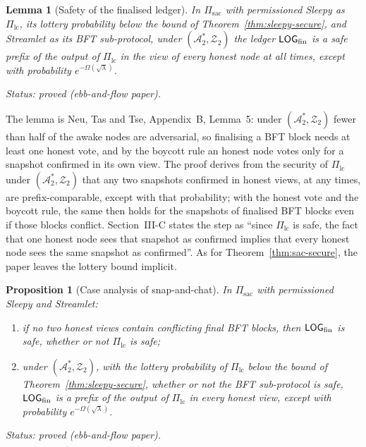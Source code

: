 \documentclass[11pt,a4paper]{article}
\newtheorem{lemma}[theorem]{Lemma}
\newtheorem{proposition}[theorem]{Proposition}
\theoremstyle{definition}
\newcommand{\Adv}{\mathcal{A}}
\newcommand{\Pilc}{\Pi_{\mathrm{lc}}}
\newcommand{\Pisac}{\Pi_{\mathrm{sac}}}
\newcommand{\Env}{\mathcal{Z}}
\begin{document}
\begin{lemma}[Safety of the finalised ledger]\label{lem:sac-fin-safe}
In $\Pisac$ with permissioned Sleepy as $\Pilc$, its lottery probability
below the bound of Theorem~\ref{thm:sleepy-secure}, and Streamlet as its BFT
sub-protocol, under $(\Adv_2^*, \Env_2)$ the ledger $\LOGfin$ is a safe
prefix of the output of $\Pilc$ in the view of every honest node at all
times, except with probability $e^{-\Omega(\sqrt{\lambda})}$.

Status: proved (ebb-and-flow paper).
\end{lemma}

The lemma is Neu, Tas and Tse, Appendix~B, Lemma~5: under
$(\Adv_2^*, \Env_2)$ fewer than half of the awake nodes are adversarial, so
finalising a BFT block needs at least one honest vote, and by the boycott
rule an honest node votes only for a snapshot confirmed in its own view. The
proof derives from the security of $\Pilc$ under $(\Adv_2^*, \Env_2)$ that
any two snapshots confirmed in honest views, at any times, are
prefix-comparable, except with that probability; with the honest vote and
the boycott rule, the same then holds for the snapshots of finalised BFT
blocks even if those blocks conflict. Section~III-C states the step as
``since $\Pilc$ is safe, the fact that one honest node sees that snapshot as
confirmed implies that every honest node sees the same snapshot as
confirmed''. As for Theorem~\ref{thm:sac-secure}, the paper leaves the
lottery bound implicit.

\begin{proposition}[Case analysis of snap-and-chat]\label{prop:sac-cases}
In $\Pisac$ with permissioned Sleepy and Streamlet:
\begin{enumerate}[label=(\roman*)]
\item if no two honest views contain conflicting final BFT blocks, then
  $\LOGfin$ is safe, whether or not $\Pilc$ is safe;
\item under $(\Adv_2^*, \Env_2)$, with the lottery probability of $\Pilc$
  below the bound of Theorem~\ref{thm:sleepy-secure}, whether or not the BFT
  sub-protocol is safe, $\LOGfin$ is a prefix of the output of $\Pilc$ in every
  honest view, except with probability $e^{-\Omega(\sqrt{\lambda})}$.
\end{enumerate}

Status: proved (ebb-and-flow paper).
\end{proposition}
\end{document}
